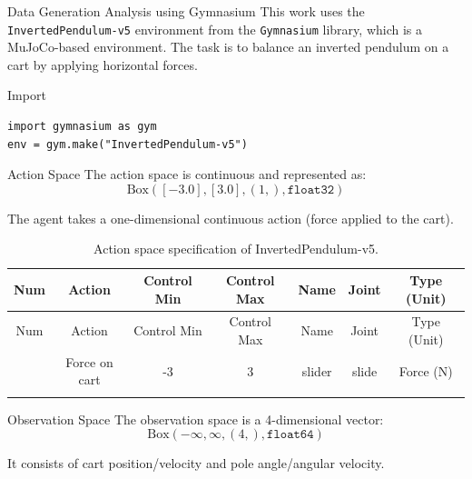 \begin{frame}[fragile]{Data Generation Analysis using Gymnasium}
\protect{}\label{data-generation-analysis-using-gymnasium}
This work uses the \texttt{InvertedPendulum-v5} environment from the
\texttt{Gymnasium} library, which is a MuJoCo-based environment. The
task is to balance an inverted pendulum on a cart by applying horizontal
forces.

\begin{block}{Import}
\protect{}\label{import}
\begin{verbatim}
import gymnasium as gym
env = gym.make("InvertedPendulum-v5")
\end{verbatim}
\end{block}

\begin{block}{Action Space}
\protect{}\label{action-space}
The action space is continuous and represented as:
\[\text{Box}([-3.0], [3.0], (1,), \texttt{float32})\]

The agent takes a one-dimensional continuous action (force applied to
the cart).

\begin{longtable}[]{@{}ccccccc@{}}
\caption{Action space specification of
InvertedPendulum-v5.}\tabularnewline
\toprule\noalign{}
Num & Action & Control Min & Control Max & Name & Joint & Type (Unit) \\
\midrule\noalign{}
\endfirsthead
\toprule\noalign{}
Num & Action & Control Min & Control Max & Name & Joint & Type (Unit) \\
\midrule\noalign{}
\endhead
0 & Force on cart & -3 & 3 & slider & slide & Force (N) \\
\bottomrule\noalign{}
\end{longtable}
\end{block}

\begin{block}{Observation Space}
\protect{}\label{observation-space}
The observation space is a 4-dimensional vector:
\[\text{Box}(-\infty, \infty, (4,), \texttt{float64})\]

It consists of cart position/velocity and pole angle/angular velocity.


\end{block}
\end{frame}
